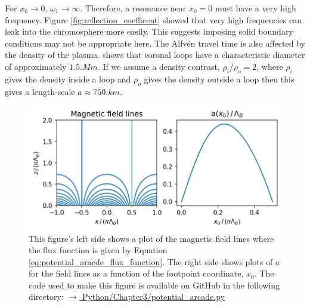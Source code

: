 For $x_0\rightarrow0$, $\omega_1\rightarrow\infty$. Therefore, a resonance near $x_0=0$ must have a very high frequency. Figure \ref{fig:reflection_coefficent} showed that very high frequencies can leak into the chromosphere more easily. This suggests imposing solid boundary conditions may not be appropriate here.
The Alfv\'en travel time is also affected by the density of the plasma. \citet{Klimchuk2015} shows that coronal loops have a characteristic diameter of approximately $1.5\si{.Mm}$. If we assume a density contrast, $\rho_i/\rho_o=2$, \citep{Hood2013,Pascoe2013} where $\rho_i$ gives the density inside a loop and $\rho_o$ gives the density outside a loop then this gives a length-scale $a\approx750\si{.km}$.

\begin{figure}
    \centering
    \vspace{-20pt}
    \includegraphics[width=\textwidth,height=0.8\textheight,keepaspectratio]{figures/chapter03/potential_arcade.png}
    \vspace{-30pt}
    \caption{This figure's left side shows a plot of the magnetic field lines where the flux function is given by Equation \eqref{eq:potential_aracde_flux_function}. The right side shows plots of $a$ for the field lines as a function of the footpoint coordinate, $x_0$. The code used to make this figure is available on GitHub in the following directory:\newline
    \href{https://github.com/aleksyprok/apkp_thesis/blob/main/Python/Chapter3/potential_arcade.py}{$\rightarrow$ Python/Chapter3/potential\_arcade.py}}
    \vspace{-10pt}
    \label{fig:potential_arcade}
\end{figure}

